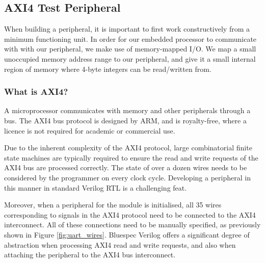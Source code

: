 \documentclass[a4paper,8pt]{report}
\begin{document}

\subsection{AXI4 Test Peripheral}
When building a peripheral, it is important to first work constructively from a
minimum functioning unit. In order for our embedded processor to communicate
with with our peripheral, we make use of memory-mapped I/O. We map a small
unoccupied memory address range to our peripheral, and give it a small internal
region of memory where 4-byte integers can be read/written from.

\subsubsection{What is AXI4?}
A microprocessor communicates with memory and other peripherals through a bus.
The AXI4 bus protocol\cite{axi4:wiki} is designed by ARM, and is royalty-free, where a licence
is not required for academic or commercial use.




Due to the inherent complexity of the AXI4 protocol, large combinatorial finite
state machines are typically required to ensure the read and write requests of
the AXI4 bus are processed correctly.
The state of over a dozen wires needs to be considered by the programmer on
every clock cycle. Developing a peripheral in this manner in standard Verilog
RTL is a challenging feat.

Moreover, when a peripheral for the module is initialised, all 35 wires
corresponding to signals in the AXI4 protocol need to be connected to the AXI4
interconnect. All of these connections need to be manually specified, as
previously shown in Figure \ref{fig:uart_wires}. Bluespec Verilog offers a
significant degree of abstraction when processing AXI4 read and write requests,
and also when attaching the peripheral to the AXI4 bus interconnect.
\end{document}
